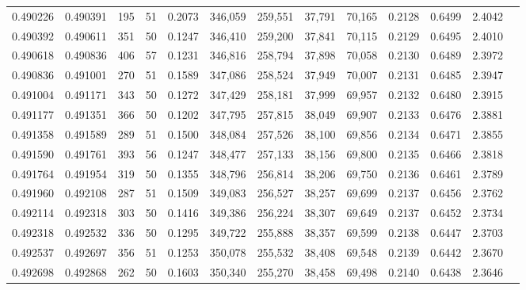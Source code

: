 \begin{tabular}{rrrrrrrrrrrrr}
0.490226 & 0.490391 &   195 &  51 &                                     0.2073 & 346,059 & 259,551 &  37,791 &  70,165 & 0.2128 & 0.6499 & 2.4042 \\
0.490392 & 0.490611 &   351 &  50 &                                     0.1247 & 346,410 & 259,200 &  37,841 &  70,115 & 0.2129 & 0.6495 & 2.4010 \\
0.490618 & 0.490836 &   406 &  57 &                                     0.1231 & 346,816 & 258,794 &  37,898 &  70,058 & 0.2130 & 0.6489 & 2.3972 \\
0.490836 & 0.491001 &   270 &  51 &                                     0.1589 & 347,086 & 258,524 &  37,949 &  70,007 & 0.2131 & 0.6485 & 2.3947 \\
0.491004 & 0.491171 &   343 &  50 &                                     0.1272 & 347,429 & 258,181 &  37,999 &  69,957 & 0.2132 & 0.6480 & 2.3915 \\
0.491177 & 0.491351 &   366 &  50 &                                     0.1202 & 347,795 & 257,815 &  38,049 &  69,907 & 0.2133 & 0.6476 & 2.3881 \\
0.491358 & 0.491589 &   289 &  51 &                                     0.1500 & 348,084 & 257,526 &  38,100 &  69,856 & 0.2134 & 0.6471 & 2.3855 \\
0.491590 & 0.491761 &   393 &  56 &                                     0.1247 & 348,477 & 257,133 &  38,156 &  69,800 & 0.2135 & 0.6466 & 2.3818 \\
0.491764 & 0.491954 &   319 &  50 &                                     0.1355 & 348,796 & 256,814 &  38,206 &  69,750 & 0.2136 & 0.6461 & 2.3789 \\
0.491960 & 0.492108 &   287 &  51 &                                     0.1509 & 349,083 & 256,527 &  38,257 &  69,699 & 0.2137 & 0.6456 & 2.3762 \\
0.492114 & 0.492318 &   303 &  50 &                                     0.1416 & 349,386 & 256,224 &  38,307 &  69,649 & 0.2137 & 0.6452 & 2.3734 \\
0.492318 & 0.492532 &   336 &  50 &                                     0.1295 & 349,722 & 255,888 &  38,357 &  69,599 & 0.2138 & 0.6447 & 2.3703 \\
0.492537 & 0.492697 &   356 &  51 &                                     0.1253 & 350,078 & 255,532 &  38,408 &  69,548 & 0.2139 & 0.6442 & 2.3670 \\
0.492698 & 0.492868 &   262 &  50 &                                     0.1603 & 350,340 & 255,270 &  38,458 &  69,498 & 0.2140 & 0.6438 & 2.3646 \\

\end{tabular}
